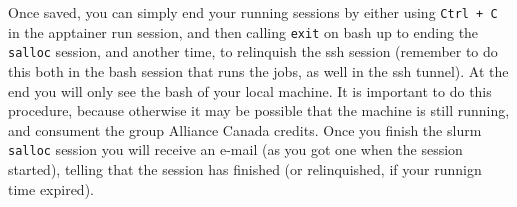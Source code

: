 \documentclass[
]{book}
\begin{document}
Once saved, you can simply end your running sessions by either using \texttt{Ctrl\ +\ C} in the apptainer run session, and then calling \texttt{exit} on bash up to ending the \texttt{salloc} session, and another time, to relinquish the ssh session (remember to do this both in the bash session that runs the jobs, as well in the ssh tunnel). At the end you will only see the bash of your local machine. It is important to do this procedure, because otherwise it may be possible that the machine is still running, and consument the group Alliance Canada credits. Once you finish the slurm \texttt{salloc} session you will receive an e-mail (as you got one when the session started), telling that the session has finished (or relinquished, if your runnign time expired).

  
\end{document}
